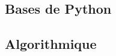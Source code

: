 \documentclass[10pt,fleqn]{article} %
\newcommand{\repStyle}{../../Style}
\begin{document}
\def\xxcompetences{}
\def\xxfigures{}

\graphicspath{{\repStyle/png/}}

\setlength{\columnseprule}{.1pt}




\pagestyle{fancy}
\thispagestyle{plain}


\proffalse

\begin{multicols}{2}
\section{Bases de Python}

\end{multicols}
\newpage

\begin{multicols}{2}
\section{Algorithmique}

\end{multicols}
\newpage
\end{document}
